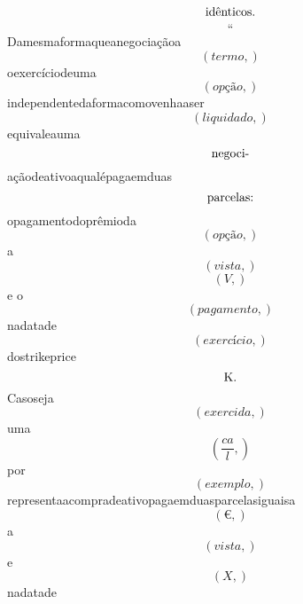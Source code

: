 \documentclass{article}
\begin{document}
\begin{equation}
$idênticos.$
\end{equation}\begin{equation}
“
\end{equation}Damesmaformaqueanegociaçãoa\begin{equation}
\left( termo,\right)
\end{equation}oexercíciodeuma\begin{equation}
\left( opção,\right)
\end{equation}independentedaformacomovenhaaser\begin{equation}
\left( liquidado,\right)
\end{equation}equivaleauma\begin{equation}
$negoci-$
\end{equation}açãodeativoaqualépagaemduas\begin{equation}
$parcelas:$
\end{equation}opagamentodoprêmioda\begin{equation}
\left( opção,\right)
\end{equation}a\begin{equation}
\left( vista,\right)
\end{equation}\begin{equation}
\left( V,\right)
\end{equation}e o\begin{equation}
\left( pagamento,\right)
\end{equation}nadatade\begin{equation}
\left( exercício,\right)
\end{equation}dostrikeprice\begin{equation}
$K.$
\end{equation}Casoseja\begin{equation}
\left( exercida,\right)
\end{equation}uma\begin{equation}
\left( \frac{ca}{l},\right)
\end{equation}por\begin{equation}
\left( exemplo,\right)
\end{equation}representaacompradeativopagaemduasparcelasiguaisa\begin{equation}
\left( €,\right)
\end{equation}a\begin{equation}
\left( vista,\right)
\end{equation}e\begin{equation}
\left( X,\right)
\end{equation}nadatade\begin{equation}

\end{equation}
\end{document}
